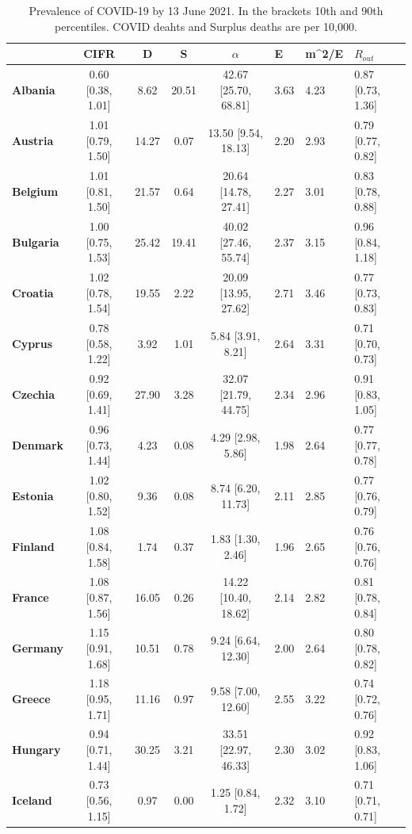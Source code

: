\begin{table}
\caption{Prevalence of COVID-19 by 13 June 2021. In the brackets 10th and 90th percentiles. COVID deahts and Surplus deaths are per 10,000.}
\begin{tabular}{lcccc}
\toprule
 & CIFR & D & S & $\alpha$ & E & m^2/E & $R_{out}$ \\
\midrule
\textbf{Albania} & 0.60 [0.38, 1.01] & 8.62 & 20.51 & 42.67 [25.70, 68.81] & 3.63 & 4.23 & 0.87 [0.73, 1.36] \\
\textbf{Austria} & 1.01 [0.79, 1.50] & 14.27 & 0.07 & 13.50 [9.54, 18.13] & 2.20 & 2.93 & 0.79 [0.77, 0.82] \\
\textbf{Belgium} & 1.01 [0.81, 1.50] & 21.57 & 0.64 & 20.64 [14.78, 27.41] & 2.27 & 3.01 & 0.83 [0.78, 0.88] \\
\textbf{Bulgaria} & 1.00 [0.75, 1.53] & 25.42 & 19.41 & 40.02 [27.46, 55.74] & 2.37 & 3.15 & 0.96 [0.84, 1.18] \\
\textbf{Croatia} & 1.02 [0.78, 1.54] & 19.55 & 2.22 & 20.09 [13.95, 27.62] & 2.71 & 3.46 & 0.77 [0.73, 0.83] \\
\textbf{Cyprus} & 0.78 [0.58, 1.22] & 3.92 & 1.01 & 5.84 [3.91, 8.21] & 2.64 & 3.31 & 0.71 [0.70, 0.73] \\
\textbf{Czechia} & 0.92 [0.69, 1.41] & 27.90 & 3.28 & 32.07 [21.79, 44.75] & 2.34 & 2.96 & 0.91 [0.83, 1.05] \\
\textbf{Denmark} & 0.96 [0.73, 1.44] & 4.23 & 0.08 & 4.29 [2.98, 5.86] & 1.98 & 2.64 & 0.77 [0.77, 0.78] \\
\textbf{Estonia} & 1.02 [0.80, 1.52] & 9.36 & 0.08 & 8.74 [6.20, 11.73] & 2.11 & 2.85 & 0.77 [0.76, 0.79] \\
\textbf{Finland} & 1.08 [0.84, 1.58] & 1.74 & 0.37 & 1.83 [1.30, 2.46] & 1.96 & 2.65 & 0.76 [0.76, 0.76] \\
\textbf{France} & 1.08 [0.87, 1.56] & 16.05 & 0.26 & 14.22 [10.40, 18.62] & 2.14 & 2.82 & 0.81 [0.78, 0.84] \\
\textbf{Germany} & 1.15 [0.91, 1.68] & 10.51 & 0.78 & 9.24 [6.64, 12.30] & 2.00 & 2.64 & 0.80 [0.78, 0.82] \\
\textbf{Greece} & 1.18 [0.95, 1.71] & 11.16 & 0.97 & 9.58 [7.00, 12.60] & 2.55 & 3.22 & 0.74 [0.72, 0.76] \\
\textbf{Hungary} & 0.94 [0.71, 1.44] & 30.25 & 3.21 & 33.51 [22.97, 46.33] & 2.30 & 3.02 & 0.92 [0.83, 1.06] \\
\textbf{Iceland} & 0.73 [0.56, 1.15] & 0.97 & 0.00 & 1.25 [0.84, 1.72] & 2.32 & 3.10 & 0.71 [0.71, 0.71] \\

\end{tabular}
\end{table}
